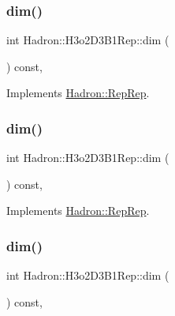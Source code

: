 \subsubsection{\texorpdfstring{dim()}{dim()}\hspace{0.1cm}{\footnotesize\ttfamily [3/5]}}
{\footnotesize\ttfamily int Hadron\+::\+H3o2\+D3\+B1\+Rep\+::dim (\begin{DoxyParamCaption}{ }\end{DoxyParamCaption}) const\hspace{0.3cm}{\ttfamily [inline]}, {\ttfamily [virtual]}}



Implements \mbox{\hyperlink{structHadron_1_1RepRep_a92c8802e5ed7afd7da43ccfd5b7cd92b}{Hadron\+::\+Rep\+Rep}}.

\mbox{\label{structHadron_1_1H3o2D3B1Rep_ad1639313bcbea6b68b3b84d10db0e203}} 
\subsubsection{\texorpdfstring{dim()}{dim()}\hspace{0.1cm}{\footnotesize\ttfamily [4/5]}}
{\footnotesize\ttfamily int Hadron\+::\+H3o2\+D3\+B1\+Rep\+::dim (\begin{DoxyParamCaption}{ }\end{DoxyParamCaption}) const\hspace{0.3cm}{\ttfamily [inline]}, {\ttfamily [virtual]}}



Implements \mbox{\hyperlink{structHadron_1_1RepRep_a92c8802e5ed7afd7da43ccfd5b7cd92b}{Hadron\+::\+Rep\+Rep}}.

\mbox{\label{structHadron_1_1H3o2D3B1Rep_ad1639313bcbea6b68b3b84d10db0e203}} 
\subsubsection{\texorpdfstring{dim()}{dim()}\hspace{0.1cm}{\footnotesize\ttfamily [5/5]}}
{\footnotesize\ttfamily int Hadron\+::\+H3o2\+D3\+B1\+Rep\+::dim (\begin{DoxyParamCaption}{ }\end{DoxyParamCaption}) const\hspace{0.3cm}{\ttfamily [inline]}, {\ttfamily [virtual]}}



